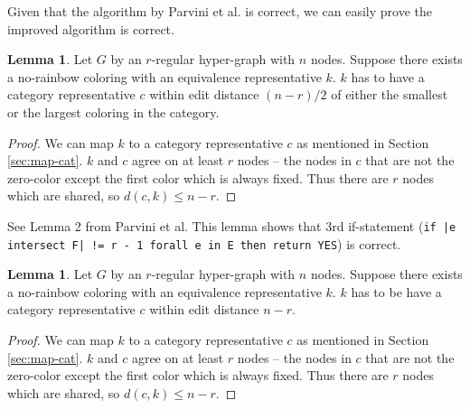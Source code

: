 \documentclass{book}
\theoremstyle{definition}
\newtheorem{lemma}[theorem]{Lemma}
\begin{document}
Given that the algorithm by Parvini et al. is correct, we can easily prove the improved algorithm is correct.

\begin{lemma}
  Let $G$ by an $r$-regular hyper-graph with $n$ nodes. Suppose there exists a no-rainbow coloring with an equivalence representative $k$. $k$ has to have a category representative $c$ within edit distance $(n - r) / 2$ of either the smallest or the largest coloring in  the category.
\end{lemma}
\begin{proof}
  We can map $k$ to a category representative $c$ as mentioned in Section \ref{sec:map-cat}. $k$ and $c$ agree on at least $r$ nodes -- the nodes in $c$ that are not the zero-color except the first color which is always fixed.  Thus there are $r$ nodes which are shared, so $d(c, k) \le n - r$.
\end{proof}

See Lemma 2 from Parvini et al. This lemma shows that 3rd if-statement (\texttt{if |e intersect F| != r - 1 forall e in E then return YES}) is correct.

\begin{lemma}
  Let $G$ by an $r$-regular hyper-graph with $n$ nodes. Suppose there exists a no-rainbow coloring with an equivalence representative $k$. $k$ has to be have a category representative $c$ within edit distance $n - r$.
\end{lemma}
\begin{proof}
  We can map $k$ to a category representative $c$ as mentioned in Section \ref{sec:map-cat}. $k$ and $c$ agree on at least $r$ nodes -- the nodes in $c$ that are not the zero-color except the first color which is always fixed. Thus there are $r$ nodes which are shared, so $d(c, k) \le n - r$.
\end{proof}

% 
\end{document}

